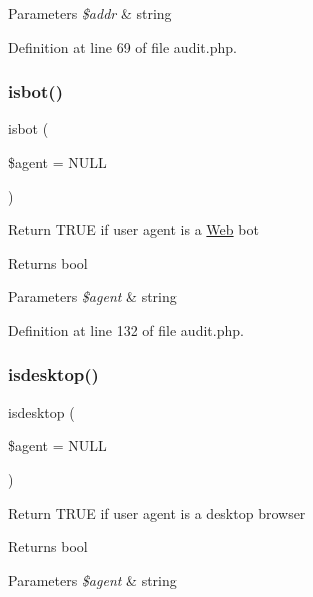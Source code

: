 \begin{DoxyParams}{Parameters}
{\em \$addr} & string \\
\hline
\end{DoxyParams}


Definition at line 69 of file audit.\+php.

\hypertarget{class_audit_a7d73389ff426668e83b171fd662018ad}{}\label{class_audit_a7d73389ff426668e83b171fd662018ad} 
\subsubsection{\texorpdfstring{isbot()}{isbot()}}
{\footnotesize\ttfamily isbot (\begin{DoxyParamCaption}\item[{}]{\$agent = {\ttfamily NULL} }\end{DoxyParamCaption})}

Return T\+R\+UE if user agent is a \hyperlink{class_web}{Web} bot \begin{DoxyReturn}{Returns}
bool 
\end{DoxyReturn}

\begin{DoxyParams}{Parameters}
{\em \$agent} & string \\
\hline
\end{DoxyParams}


Definition at line 132 of file audit.\+php.

\hypertarget{class_audit_ac6c1cda9920c8236cd00d10bffb2890f}{}\label{class_audit_ac6c1cda9920c8236cd00d10bffb2890f} 
\subsubsection{\texorpdfstring{isdesktop()}{isdesktop()}}
{\footnotesize\ttfamily isdesktop (\begin{DoxyParamCaption}\item[{}]{\$agent = {\ttfamily NULL} }\end{DoxyParamCaption})}

Return T\+R\+UE if user agent is a desktop browser \begin{DoxyReturn}{Returns}
bool 
\end{DoxyReturn}

\begin{DoxyParams}{Parameters}
{\em \$agent} & string \\
\hline
\end{DoxyParams}


